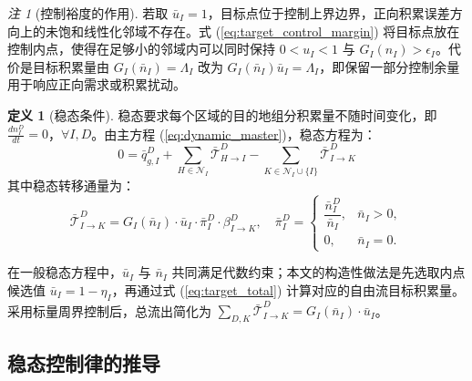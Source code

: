 \documentclass[a4paper,12pt]{article}
\theoremstyle{plain}
\theoremstyle{definition}
\newtheorem{definition}[theorem]{定义}
\theoremstyle{remark}
\newtheorem{remark}[theorem]{注}
\begin{document}
\begin{remark}[控制裕度的作用]\label{rem:control_margin}
若取 $\bar u_I=1$，目标点位于控制上界边界，正向积累误差方向上的未饱和线性化邻域不存在。式 (\ref{eq:target_control_margin}) 将目标点放在控制内点，使得在足够小的邻域内可以同时保持 $0<u_I<1$ 与 $G_I(n_I)>\epsilon_I$。代价是目标积累量由 $G_I(\bar n_I)=\Lambda_I$ 改为 $G_I(\bar n_I)\bar u_I=\Lambda_I$，即保留一部分控制余量用于响应正向需求或积累扰动。
\end{remark}

\begin{definition}[稳态条件]\label{def:steady_state}
稳态要求每个区域的目的地组分积累量不随时间变化，即 $\frac{dn_I^D}{dt} = 0$，$\forall I, D$。由主方程 (\ref{eq:dynamic_master})，稳态方程为：
\begin{equation}\label{eq:steady_state_eq}
    0 = \bar{q}_{g,I}^D + \sum_{H \in \mathcal{N}_I} \bar{\mathcal{T}}_{H \to I}^D - \sum_{K \in \mathcal{N}_I \cup \{I\}} \bar{\mathcal{T}}_{I \to K}^D
\end{equation}
其中稳态转移通量为：
\begin{equation}\label{eq:steady_transfer}
    \bar{\mathcal{T}}_{I \to K}^D = G_I(\bar{n}_I) \cdot \bar{u}_I \cdot \bar\pi_I^D \cdot \beta_{I \to K}^D,
    \quad
    \bar\pi_I^D=
    \begin{cases}
    \dfrac{\bar n_I^D}{\bar n_I}, & \bar n_I>0,\\[0.8em]
    0, & \bar n_I=0 .
    \end{cases}
\end{equation}
\end{definition}

在一般稳态方程中，$\bar u_I$ 与 $\bar n_I$ 共同满足代数约束；本文的构造性做法是先选取内点候选值 $\bar u_I=1-\eta_I$，再通过式 (\ref{eq:target_total}) 计算对应的自由流目标积累量。采用标量周界控制后，总流出简化为 $\sum_{D,K} \bar{\mathcal{T}}_{I \to K}^D = G_I(\bar{n}_I) \cdot \bar{u}_I$。

\subsection{稳态控制律的推导}
\end{document}

